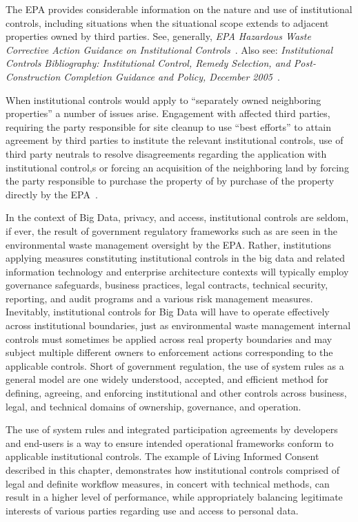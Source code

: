 The EPA provides considerable information on the nature and use of institutional controls, including situations when the situational scope extends to adjacent properties owned by third parties.
See, generally, {\em EPA Hazardous Waste Corrective Action Guidance on Institutional Controls}~\cite{EPA2007}.
Also see: {\em Institutional Controls Bibliography: Institutional Control, Remedy Selection, and Post-Construction Completion Guidance and Policy, December 2005}~\cite{EPAbibliography2005}.

When institutional controls would apply to ``separately owned neighboring properties'' a number of issues arise.
Engagement with affected third parties, requiring the party responsible for site cleanup to use ``best efforts'' to attain agreement by third parties to institute the relevant institutional controls, use of third party neutrals to resolve disagreements regarding the application with 
institutional control,s or forcing an acquisition of the neighboring land by forcing the party responsible to purchase the property of by purchase of the property directly by the EPA~\cite{EPA-540-R-09-001}.

In the context of Big Data, privacy, and access, institutional controls are seldom, if ever, the result of government regulatory frameworks such as are seen in the environmental waste management oversight by the EPA.
Rather, institutions applying measures constituting institutional controls in the big data and related information technology and enterprise architecture contexts will typically employ governance safeguards, business practices, legal contracts, technical security, reporting, and audit programs and a various risk management measures.
Inevitably, institutional controls for Big Data will have to operate effectively across institutional boundaries, just as environmental waste management internal controls must sometimes be applied across real property boundaries and may subject multiple different owners to enforcement actions corresponding to the applicable controls.
Short of government regulation, the use of system rules as a general model are one widely understood, accepted, and efficient method for defining, agreeing, and enforcing institutional and other controls across business, legal, and technical domains of ownership, governance, and operation.

The use of system rules and integrated participation agreements by developers and end-users is a way to ensure intended operational frameworks conform to applicable institutional controls.
The example of Living Informed Consent described in this chapter, demonstrates how institutional controls comprised of legal and definite workflow measures, in concert with technical methods, can result in a higher level of performance, while appropriately balancing legitimate interests of various parties regarding use and access to personal data.

